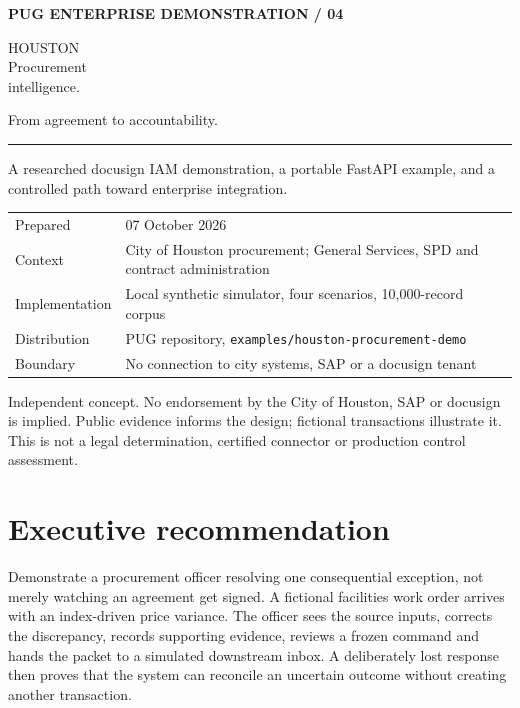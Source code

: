 \documentclass[11pt,letterpaper]{article}
\newcommand{\code}[1]{\texttt{\small #1}}
\begin{document}
\begin{titlepage}
\color{navy}
{\small\bfseries PUG \hfill ENTERPRISE DEMONSTRATION / 04}\par
\vspace{1.15in}
{\fontsize{43}{47}\selectfont HOUSTON\\Procurement\\intelligence.}\par
\vspace{0.3in}
{\Large From agreement to accountability.}\par
\vspace{0.3in}
{\color{gold}\rule{0.7\linewidth}{3pt}}\par
\vspace{0.3in}
{\large A researched docusign IAM demonstration, a portable FastAPI example, and a controlled path toward enterprise integration.}\par
\vfill
\begin{tabularx}{\linewidth}{@{}lX@{}}
Prepared & 07 October 2026\\
Context & City of Houston procurement; General Services, SPD and contract administration\\
Implementation & Local synthetic simulator, four scenarios, 10,000-record corpus\\
Distribution & PUG repository, \code{examples/houston-procurement-demo}\\
Boundary & No connection to city systems, SAP or a docusign tenant\\
\end{tabularx}
\vspace{0.3in}
\small Independent concept. No endorsement by the City of Houston, SAP or docusign is implied. Public evidence informs the design; fictional transactions illustrate it. This is not a legal determination, certified connector or production control assessment.
\end{titlepage}
\tableofcontents\newpage
\section{Executive recommendation}
Demonstrate a procurement officer resolving one consequential exception, not merely watching an agreement get signed. A fictional facilities work order arrives with an index-driven price variance. The officer sees the source inputs, corrects the discrepancy, records supporting evidence, reviews a frozen command and hands the packet to a simulated downstream inbox. A deliberately lost response then proves that the system can reconcile an uncertain outcome without creating another transaction.
\end{document}
